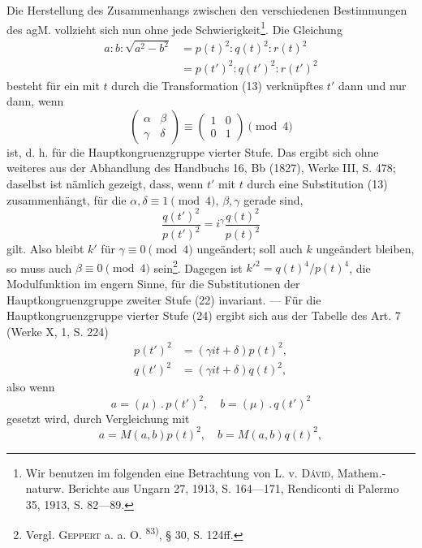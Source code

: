 Die Herstellung des Zusammenhangs zwischen den verschiedenen Bestimmungen
des agM. vollzieht sich nun ohne jede Schwierigkeit\footnote{Wir benutzen im folgenden eine Betrachtung von L. v. \textsc{Dávid}, Mathem.-naturw. Berichte aus Ungarn 27, 1913, S. 164—171, Rendiconti di Palermo 35, 1913, S. 82—89.}. Die
Gleichung
\[
\begin{aligned}
a:b:\sqrt{a^2-b^2}&=p(t)^2:q(t)^2:r(t)^2\\
&=p(t')^2:q(t')^2:r(t')^2
\end{aligned}
\]
\noindent besteht für ein mit \(t\) durch die Transformation (13) verknüpftes \(t'\) dann und
nur dann, wenn
\begingroup\makeatletter\tagsleft@true\let\veqno\leqno\makeatother
\begin{equation*}
\begin{pmatrix}\alpha&\beta\\\gamma&\delta\end{pmatrix}
\equiv\begin{pmatrix}1&0\\0&1\end{pmatrix}\pmod 4\tag{24}
\end{equation*}
\endgroup
\noindent ist, d. h. für die Hauptkongruenzgruppe vierter Stufe. Das ergibt sich ohne
weiteres aus der Abhandlung des Handbuchs 16, Bb (1827), Werke III,
S. 478; daselbst ist nämlich gezeigt, dass, wenn \(t'\) mit \(t\) durch eine Substitution
(13) zusammenhängt, für die \(\alpha,\delta\equiv1\pmod4\), \(\beta,\gamma\) gerade sind,
\[
\frac{q(t')^2}{p(t')^2}=i^\gamma\frac{q(t)^2}{p(t)^2}
\]
\noindent gilt. Also bleibt \(k'\) für \(\gamma\equiv0\pmod4\) ungeändert; soll auch \(k\) ungeändert
bleiben, so muss auch \(\beta\equiv0\pmod4\) sein\footnote{Vergl. \textsc{Geppert} a. a. O. \textsuperscript{83)}, § 30, S. 124ff.}. Dagegen ist \(k'^2=q(t)^4/p(t)^4\),
die Modulfunktion im engern Sinne, für die Substitutionen der Hauptkongruenzgruppe
zweiter Stufe (22) invariant. — Für die Hauptkongruenzgruppe
vierter Stufe (24) ergibt sich aus der Tabelle des Art. 7 (Werke X, 1, S. 224)
\clearpage{}
\[
\begin{aligned}
p(t')^2&=(\gamma it+\delta)p(t)^2,\\
q(t')^2&=(\gamma it+\delta)q(t)^2,
\end{aligned}
\]
\noindent also wenn
\[
a=(\mu)\mathpunct{.}p(t')^2,\quad b=(\mu)\mathpunct{.}q(t')^2
\]
\noindent gesetzt wird, durch Vergleichung mit
\[
a=M(a,b)p(t)^2,\quad b=M(a,b)q(t)^2,
\]

